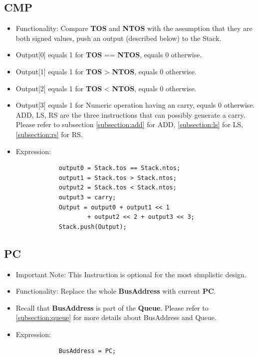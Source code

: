 \documentclass[11pt]{report}
\begin{document}
    \subsection{CMP}
    \label{subsection:cmp}
    \begin{itemize}
        \item Functionality: Compare \textbf{TOS} and \textbf{NTOS} with the assumption 
                that they are both signed values, push an output (described below) to the Stack.
        \item Output[0] equals 1 for \textbf{TOS} == \textbf{NTOS}, equals 0 otherwise.
        \item Output[1] equals 1 for \textbf{TOS} > \textbf{NTOS}, equals 0 otherwise.
        \item Output[2] equals 1 for \textbf{TOS} < \textbf{NTOS}, equals 0 otherwise.
        \item Output[3] equals 1 for Numeric operation having an carry, equals 0 otherwise.
                        ADD, LS, RS are the three instructions that can possibly generate a carry.
                        Please refer to subsection \ref{subsection:add} for ADD, \ref{subsection:ls} for LS, 
                        \ref{subsection:rs} for RS.
        \item Expression:
        \begin{verbatim}
            output0 = Stack.tos == Stack.ntos;
            output1 = Stack.tos > Stack.ntos;
            output2 = Stack.tos < Stack.ntos;
            output3 = carry;
            Output = output0 + output1 << 1 
                    + output2 << 2 + output3 << 3;
            Stack.push(Output);
        \end{verbatim}
    \end{itemize}

    \subsection{PC}
    \begin{itemize}
        \item Important Note: This Instruction is optional for the most simplistic design.
        \item Functionality: Replace the whole \textbf{BusAddress} with current \textbf{PC}.
        \item Recall that \textbf{BusAddress} is part of the \textbf{Queue}. Please refer to \ref{subsection:queue}
                for more details about BusAddress and Queue.
        \item Expression:
        \begin{verbatim}
            BusAddress = PC;
        \end{verbatim}
    \end{itemize}
\end{document}
